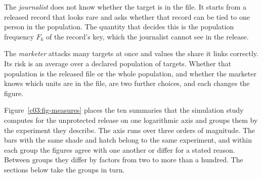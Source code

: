 The \emph{journalist} does not know whether the target is in the file. It starts from a
released record that looks rare and asks whether that record can be tied to one person
in the population. The quantity that decides this is the population frequency $F_k$ of
the record's key, which the journalist cannot see in the release.

The \emph{marketer} attacks many targets at once and values the share it links
correctly. Its risk is an average over a declared population of targets. Whether that
population is the released file or the whole population, and whether the marketer knows
which units are in the file, are two further choices, and each changes the figure.

Figure~\ref{c03:fig-measures} places the ten summaries that the simulation study
computes for the unprotected release on one logarithmic axis and groups them by the
experiment they describe. The axis runs over three orders of magnitude. The bars with
the same shade and hatch belong to the same experiment, and within each group the
figures agree with one another or differ for a stated reason. Between groups they
differ by factors from two to more than a hundred. The sections below take the groups in
turn.

